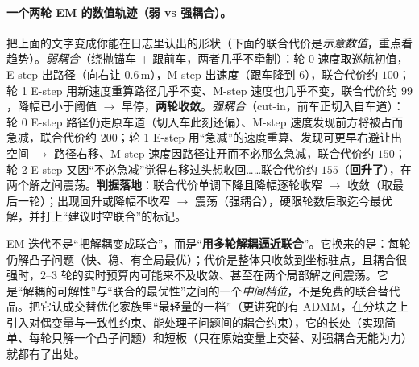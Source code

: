 \paragraph{一个两轮 EM 的数值轨迹（弱 vs 强耦合）。}
把上面的文字变成你能在日志里认出的形状（下面的联合代价是\emph{示意数值}，重点看趋势）。\emph{弱耦合}（绕抛锚车 + 跟前车，两者几乎不牵制）：轮 0 速度取巡航初值，E-step 出路径（向右让 $0.6\,\mathrm{m}$），M-step 出速度（跟车降到 $6$），联合代价约 $100$；轮 1 E-step 用新速度重算路径几乎不变、M-step 速度也几乎不变，联合代价约 $99$，降幅已小于阈值 $\to$ 早停，\textbf{两轮收敛}。\emph{强耦合}（cut-in，前车正切入自车道）：轮 0 E-step 路径仍走原车道（切入车此刻还偏）、M-step 速度发现前方将被占而急减，联合代价约 $200$；轮 1 E-step 用“急减”的速度重算、发现可更早右避让出空间 $\to$ 路径右移、M-step 速度因路径让开而不必那么急减，联合代价约 $150$；轮 2 E-step 又因“不必急减”觉得右移过头想收回……联合代价约 $155$（\textbf{回升了}），在两个解之间震荡。\textbf{判据落地}：联合代价单调下降且降幅逐轮收窄 $\to$ 收敛（取最后一轮）；出现回升或降幅不收窄 $\to$ 震荡（强耦合），硬限轮数后取迄今最优解，并打上“建议时空联合”的标记。

\begin{insight}
EM 迭代不是“把解耦变成联合”，而是“\textbf{用多轮解耦逼近联合}”。它换来的是：每轮仍解凸子问题（快、稳、有全局最优）；代价是整体只收敛到坐标驻点，且耦合很强时，$2$--$3$ 轮的实时预算内可能来不及收敛、甚至在两个局部解之间震荡。它是“解耦的可解性”与“联合的最优性”之间的一个\emph{中间档位}，不是免费的联合替代品。把它认成交替优化家族里“最轻量的一档”（更讲究的有 ADMM，在分块之上引入对偶变量与一致性约束、能处理子问题间的耦合约束），它的长处（实现简单、每轮只解一个凸子问题）和短板（只在原始变量上交替、对强耦合无能为力）就都有了出处。
\end{insight}

